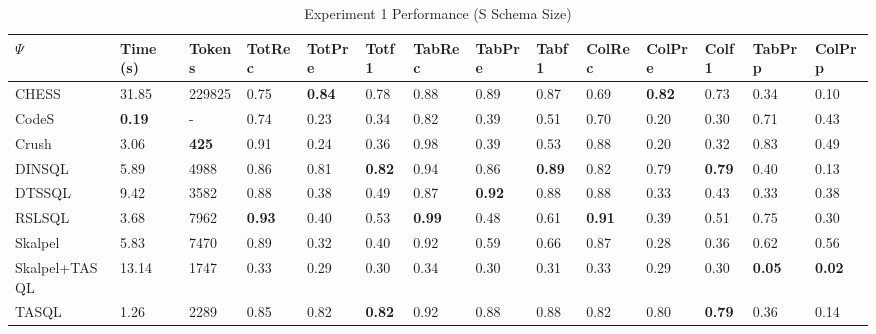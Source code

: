 \begin{table}
\caption{Experiment 1 Performance (S Schema Size)}
\label{tab:exp1-s-schema}
\begin{tabular}{llllllllllllll}
\toprule
$\Psi$ & Time (s) & Tokens & TotRec & TotPre & Totf1 & TabRec & TabPre & Tabf1 & ColRec & ColPre & Colf1 & TabPrp & ColPrp \\
\midrule
CHESS & 31.85 & 229825 & 0.75 & \textbf{0.84} & 0.78 & 0.88 & 0.89 & 0.87 & 0.69 & \textbf{0.82} & 0.73 & 0.34 & 0.10 \\
CodeS & \textbf{0.19} & - & 0.74 & 0.23 & 0.34 & 0.82 & 0.39 & 0.51 & 0.70 & 0.20 & 0.30 & 0.71 & 0.43 \\
Crush & 3.06 & \textbf{425} & 0.91 & 0.24 & 0.36 & 0.98 & 0.39 & 0.53 & 0.88 & 0.20 & 0.32 & 0.83 & 0.49 \\
DINSQL & 5.89 & 4988 & 0.86 & 0.81 & \textbf{0.82} & 0.94 & 0.86 & \textbf{0.89} & 0.82 & 0.79 & \textbf{0.79} & 0.40 & 0.13 \\
DTSSQL & 9.42 & 3582 & 0.88 & 0.38 & 0.49 & 0.87 & \textbf{0.92} & 0.88 & 0.88 & 0.33 & 0.43 & 0.33 & 0.38 \\
RSLSQL & 3.68 & 7962 & \textbf{0.93} & 0.40 & 0.53 & \textbf{0.99} & 0.48 & 0.61 & \textbf{0.91} & 0.39 & 0.51 & 0.75 & 0.30 \\
Skalpel & 5.83 & 7470 & 0.89 & 0.32 & 0.40 & 0.92 & 0.59 & 0.66 & 0.87 & 0.28 & 0.36 & 0.62 & 0.56 \\
Skalpel+TASQL & 13.14 & 1747 & 0.33 & 0.29 & 0.30 & 0.34 & 0.30 & 0.31 & 0.33 & 0.29 & 0.30 & \textbf{0.05} & \textbf{0.02} \\
TASQL & 1.26 & 2289 & 0.85 & 0.82 & \textbf{0.82} & 0.92 & 0.88 & 0.88 & 0.82 & 0.80 & \textbf{0.79} & 0.36 & 0.14 \\
\bottomrule
\end{tabular}
\end{table}
